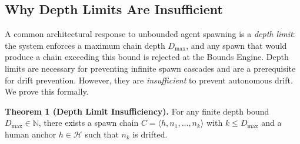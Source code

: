 \subsection{Why Depth Limits Are Insufficient}
\label{sec:rs-drift-depth-insufficiency}

A common architectural response to unbounded agent spawning is a \emph{depth limit}: the system enforces a maximum chain depth $D_{\max}$, and any spawn that would produce a chain exceeding this bound is rejected at the Bounds Engine. Depth limits are necessary for preventing infinite spawn cascades and are a prerequisite for drift prevention. However, they are \emph{insufficient} to prevent autonomous drift. We prove this formally.

\medskip
\noindent\textbf{Theorem 1 (Depth Limit Insufficiency).}
For any finite depth bound $D_{\max} \in \mathbb{N}$, there exists a spawn chain $C = \langle h, n_1, \ldots, n_k \rangle$ with $k \leq D_{\max}$ and a human anchor $h \in \mathcal{H}$ such that $n_k$ is drifted.

